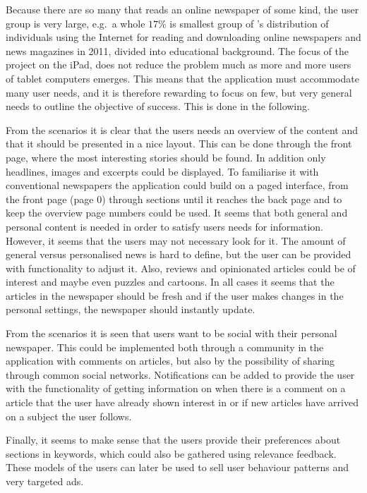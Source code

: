 Because there are so many that reads an online newspaper of some kind, the user group is very large, e.g.\ a whole $17\%$ is smallest group of \cite{Eurostat}'s distribution of individuals using the Internet for reading and downloading online newspapers and news magazines in 2011, divided into educational background. The focus of the project on the iPad, does not reduce the problem much as more and more users of tablet computers emerges. This means that the application must accommodate many user needs, and it is therefore rewarding to focus on few, but very general needs to outline the objective of success. This is done in the following.

From the scenarios it is clear that the users needs an overview of the content and that it should be presented in a nice layout. This can be done through the front page, where the most interesting stories should be found. In addition only headlines, images and excerpts could be displayed. To familiarise it with conventional newspapers the application could build on a paged interface, from the front page (page $0$) through sections until it reaches the back page and to keep the overview page numbers could be used. It seems that both general and personal content is needed in order to satisfy users needs for information. However, it seems that the users may not necessary look for it. The amount of general versus personalised news is hard to define, but the user can be provided with functionality to adjust it. Also, reviews and opinionated articles could be of interest and maybe even puzzles and cartoons. In all cases it seems that the articles in the newspaper should be fresh and if the user makes changes in the personal settings, the newspaper should instantly update.

From the scenarios it is seen that users want to be social with their personal newspaper. This could be implemented both through a community in the application with comments on articles, but also by the possibility of sharing through common social networks. Notifications can be added to provide the user with the functionality of getting information on when there is a comment on a article that the user have already shown interest in or if new articles have arrived on a subject the user follows.

Finally, it seems to make sense that the users provide their preferences about sections in keywords, which could also be gathered using relevance feedback. These models of the users can later be used to sell user behaviour patterns and very targeted ads.

